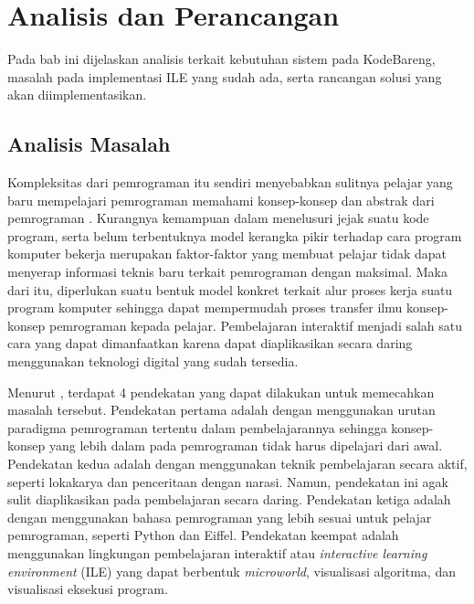 \chapter{Analisis dan Perancangan}
Pada bab ini dijelaskan analisis terkait kebutuhan sistem pada KodeBareng, masalah pada implementasi ILE yang sudah ada, serta rancangan solusi yang akan diimplementasikan.

\section{Analisis Masalah}


Kompleksitas dari pemrograman itu sendiri menyebabkan sulitnya pelajar yang baru mempelajari pemrograman memahami konsep-konsep dan abstrak dari pemrograman \parencite{moons2013pilot}. Kurangnya kemampuan dalam menelusuri jejak suatu kode program, serta belum terbentuknya model kerangka pikir terhadap cara program komputer bekerja \parencite{mayer1981psychology} merupakan faktor-faktor yang membuat pelajar tidak dapat menyerap informasi teknis baru terkait pemrograman dengan maksimal. Maka dari itu, diperlukan suatu bentuk model konkret terkait alur proses kerja suatu program komputer sehingga dapat mempermudah proses transfer ilmu konsep-konsep pemrograman kepada pelajar. Pembelajaran interaktif menjadi salah satu cara yang dapat dimanfaatkan karena dapat diaplikasikan secara daring menggunakan teknologi digital yang sudah tersedia.

Menurut \textcite{moons2013pilot}, terdapat 4 pendekatan yang dapat dilakukan untuk memecahkan masalah tersebut. Pendekatan pertama adalah dengan menggunakan urutan paradigma pemrograman tertentu dalam pembelajarannya sehingga konsep-konsep yang lebih dalam pada pemrograman tidak harus dipelajari dari awal. Pendekatan kedua adalah dengan menggunakan teknik pembelajaran secara aktif, seperti lokakarya dan penceritaan dengan narasi. Namun, pendekatan ini agak sulit diaplikasikan pada pembelajaran secara daring. Pendekatan ketiga adalah dengan menggunakan bahasa pemrograman yang lebih sesuai untuk pelajar pemrograman, seperti Python dan Eiffel. Pendekatan keempat adalah menggunakan lingkungan pembelajaran interaktif atau \textit{interactive learning environment} (ILE) yang dapat berbentuk \textit{microworld}, visualisasi algoritma, dan visualisasi eksekusi program.

